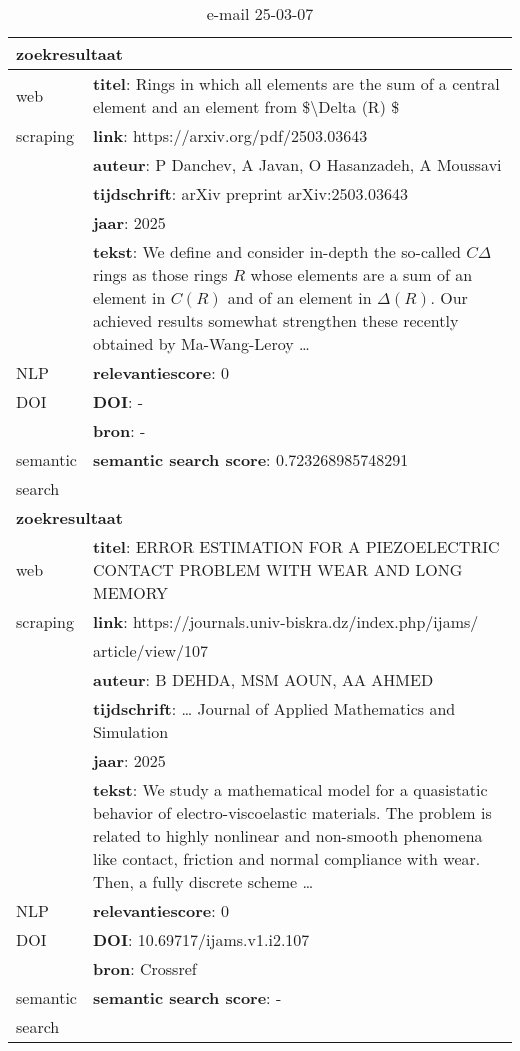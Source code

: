 \begin{table}[h!]
    \caption{e-mail 25-03-07}
    \centering
    \begin{tabularx}{\textwidth}{|p{4cm}|X|} 
        \hline
        \multicolumn{2}{|X|}{\textbf{zoekresultaat}} \\
        \hline
        web &\textbf{titel}: Rings in which all elements are the sum of a central element and an element from \$\textbackslash Delta (R) \$\\
        scraping&\textbf{link}: https://arxiv.org/pdf/2503.03643\\
        &\textbf{auteur}: P Danchev, A Javan, O Hasanzadeh, A Moussavi\\
        &\textbf{tijdschrift}: arXiv preprint arXiv:2503.03643\\
        &\textbf{jaar}: 2025\\
        &\textbf{tekst}: We define and consider in-depth the so-called $C\Delta$ rings as those rings $R$ whose elements are a sum of an element in $C(R)$ and of an element in $\Delta(R)$. Our achieved results somewhat strengthen these recently obtained by Ma-Wang-Leroy …\\
        \hline
        NLP&\textbf{relevantiescore}: 0\\
        \hline
        DOI&\textbf{DOI}: -\\
        &\textbf{bron}: -\\
        \hline
        semantic&\textbf{semantic search score}: 0.723268985748291\\
        search&\\
        \hline
        \multicolumn{2}{|X|}{\textbf{zoekresultaat}} \\
        \hline
        web &\textbf{titel}: ERROR ESTIMATION FOR A PIEZOELECTRIC CONTACT PROBLEM WITH WEAR AND LONG MEMORY\\
        scraping&\textbf{link}: https://journals.univ-biskra.dz/index.php/ijams/\\&article/view/107\\
        &\textbf{auteur}: B DEHDA, MSM AOUN, AA AHMED\\
        &\textbf{tijdschrift}: … Journal of Applied Mathematics and Simulation\\
        &\textbf{jaar}: 2025\\
        &\textbf{tekst}: We study a mathematical model for a quasistatic behavior of electro-viscoelastic materials. The problem is related to highly nonlinear and non-smooth phenomena like contact, friction and normal compliance with wear. Then, a fully discrete scheme …\\
        \hline
        NLP&\textbf{relevantiescore}: 0\\
        \hline
        DOI&\textbf{DOI}: 10.69717/ijams.v1.i2.107\\
        &\textbf{bron}: Crossref\\
        \hline
        semantic&\textbf{semantic search score}: -\\
        search&\\
        \hline
    \end{tabularx}
    \label{table:email20250307}
\end{table}
